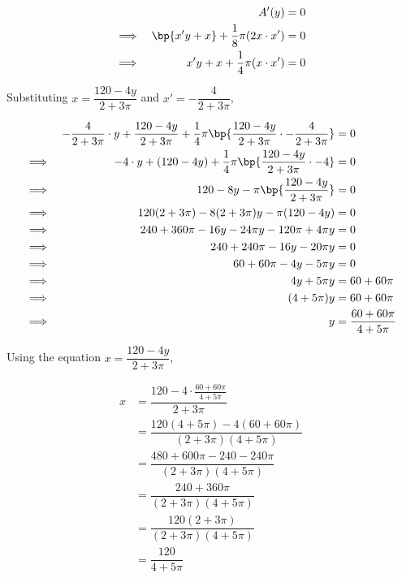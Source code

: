 \documentclass{echw}
\begin{document}
        \begin{alignat*}{2}
            &&A'(y) &= 0\\
            \implies&&\bp{x' y + x} + \dfrac18 \pi (2x \cdot x') &= 0\\
            \implies&&x' y + x + \dfrac14 \pi (x \cdot x') &= 0
        \end{alignat*}

        Substituting $x = \dfrac{120-4y}{2+3\pi}$ and $x' = -\dfrac4{2 + 3\pi}$,

        \begin{alignat*}{2}
            &&-\dfrac4{2 + 3\pi} \cdot y + \dfrac{120-4y}{2+3\pi} + \dfrac14 \pi \bp{\dfrac{120-4y}{2+3\pi} \cdot -\dfrac4{2 + 3\pi}} &= 0\\
            \implies&&-4 \cdot y + (120-4y) + \dfrac14 \pi \bp{\dfrac{120-4y}{2+3\pi} \cdot -4} &= 0\\
            \implies&&120 - 8y - \pi \bp{\dfrac{120-4y}{2+3\pi}} &= 0\\
            \implies&&120(2+3\pi) - 8(2+3\pi)y - \pi(120-4y) &= 0\\
            \implies&&240 + 360\pi - 16y - 24\pi y - 120\pi + 4\pi y &= 0\\
            \implies&&240 + 240\pi - 16y - 20\pi y &= 0\\
            \implies&&60 + 60\pi - 4y - 5\pi y &= 0\\
            \implies&& 4y + 5\pi y &= 60 + 60\pi\\
            \implies&& (4 + 5\pi)y &= 60 + 60\pi\\
            \implies&& y &= \dfrac{60 + 60\pi}{4 + 5\pi}\\
        \end{alignat*}

        Using the equation $x = \dfrac{120-4y}{2 + 3\pi}$, 

        \begin{align*}
            x &= \dfrac{120-4\cdot\tfrac{60 + 60\pi}{4 + 5\pi}}{2 + 3\pi}\\
            &= \dfrac{120(4+5\pi) - 4(60 + 60\pi)}{(2+3\pi)(4+5\pi)}\\
            &= \dfrac{480 + 600\pi - 240 -240\pi}{(2+3\pi)(4+5\pi)}\\
            &= \dfrac{240 + 360\pi}{(2+3\pi)(4+5\pi)}\\
            &= \dfrac{120 (2 + 3\pi)}{(2+3\pi)(4+5\pi)}\\
            &= \dfrac{120}{4+5\pi}
        \end{align*}
\end{document}
